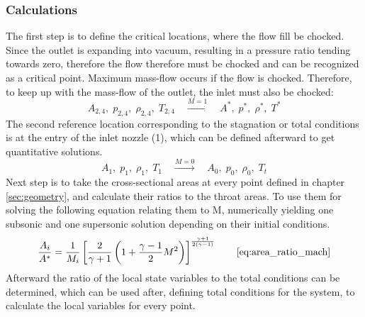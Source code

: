\subsubsection*{Calculations}

	The first step is to define the critical locations, where the flow fill be chocked.
	Since the outlet is expanding into vacuum, resulting in a pressure ratio tending towards zero, therefore the flow therefore must be chocked and can be recognized as a critical point.
	Maximum mass-flow occurs if the flow is chocked. Therefore, to keep up with the mass-flow of the outlet, the inlet must also be chocked: 
	$$
		A_{2,4},\;p_{2,4},\;\rho_{2,4},\;T_{2,4}\quad\xrightarrow{M=1}\quad A^*,\;p^*,\;\rho^*,\;T^*
	$$
	The second reference location corresponding to the stagnation or total conditions is at the entry of the inlet nozzle (1), which can be defined afterward to get quantitative solutions.
	$$
		A_1,\;p_1,\;\rho_1,\;T_1\quad\xrightarrow{M=0}\quad A_0,\;p_0,\;\rho_0,\;T_t
	$$
	Next step is to take the cross-sectional areas at every point defined in chapter \ref{sec:geometry}, and calculate their ratios to the throat areas.
	To use them for solving the following equation relating them to M, numerically yielding one subsonic and one supersonic solution depending on their initial conditions.
	$$
		\frac{A_i}{A^*} = \frac{1}{M_i} \left[ \frac{2}{\gamma + 1} \left( 1 + \frac{\gamma - 1}{2} M^2 \right) \right]^{\frac{\gamma + 1}{2(\gamma - 1)}}
		\qquad \eqref{eq:area_ratio_mach}
	$$
	Afterward the ratio of the local state variables to the total conditions can be determined, which can be used after, defining total conditions for the system, to calculate the local variables for every point.
	\cite{hall_isentropic_nodate}


